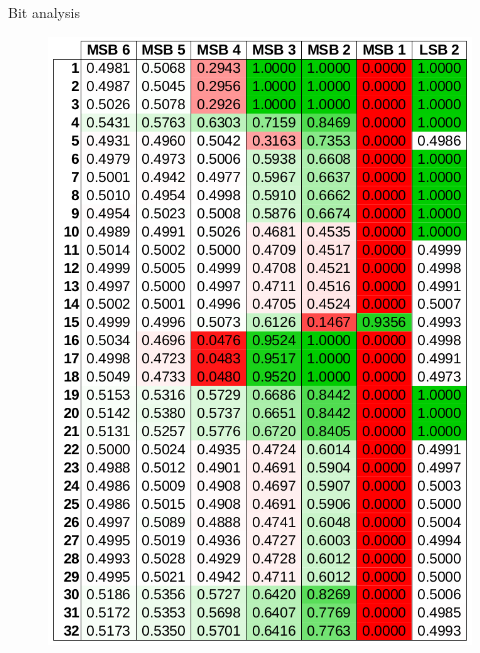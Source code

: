 \documentclass{beamer}
\begin{document}
\begin{darkframes}
    \begin{frame}{Bit analysis}
      \begin{figure}[H]
        \centering
        \begin{minipage}{.5\textwidth}
          \centering
          \includegraphics[width=0.96\linewidth]{../tex/images/analysis/presentation_bit_1}
        \end{minipage}%
        \begin{minipage}{.5\textwidth}
          \centering

\end{minipage}
\end{figure}
\end{frame}
\end{darkframes}
\end{document}

